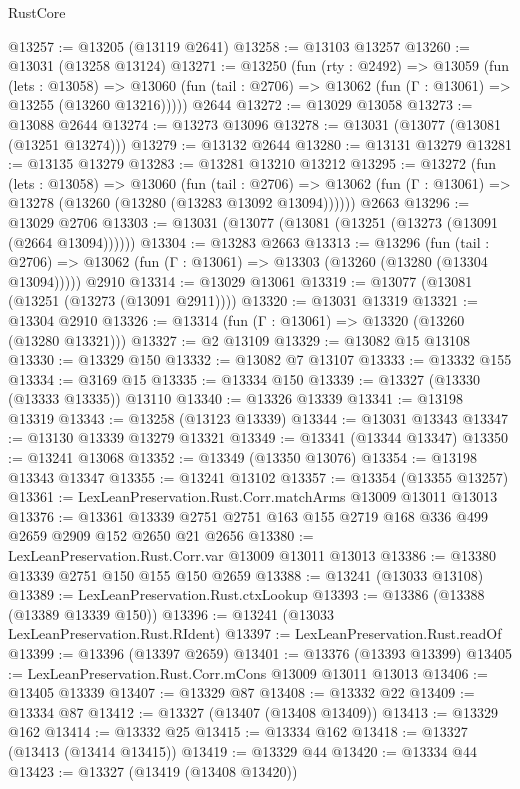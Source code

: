 \begin{lexlean}{RustCore}
\begin{coremodule}
@13257 := @13205 (@13119 @2641)
@13258 := @13103 @13257
@13260 := @13031 (@13258 @13124)
@13271 := @13250
    (fun (rty : @2492) =>
    @13059
      (fun (lets : @13058) =>
      @13060 (fun (tail : @2706) => @13062 (fun (Γ : @13061) => @13255 (@13260 @13216)))))
    @2644
@13272 := @13029 @13058
@13273 := @13088 @2644
@13274 := @13273 @13096
@13278 := @13031 (@13077 (@13081 (@13251 @13274)))
@13279 := @13132 @2644
@13280 := @13131 @13279
@13281 := @13135 @13279
@13283 := @13281 @13210 @13212
@13295 := @13272
    (fun (lets : @13058) =>
    @13060
      (fun (tail : @2706) =>
      @13062 (fun (Γ : @13061) => @13278 (@13260 (@13280 (@13283 @13092 @13094))))))
    @2663
@13296 := @13029 @2706
@13303 := @13031 (@13077 (@13081 (@13251 (@13273 (@13091 (@2664 @13094))))))
@13304 := @13283 @2663
@13313 := @13296
    (fun (tail : @2706) => @13062 (fun (Γ : @13061) => @13303 (@13260 (@13280 (@13304 @13094)))))
    @2910
@13314 := @13029 @13061
@13319 := @13077 (@13081 (@13251 (@13273 (@13091 @2911))))
@13320 := @13031 @13319
@13321 := @13304 @2910
@13326 := @13314 (fun (Γ : @13061) => @13320 (@13260 (@13280 @13321)))
@13327 := @2 @13109
@13329 := @13082 @15 @13108
@13330 := @13329 @150
@13332 := @13082 @7 @13107
@13333 := @13332 @155
@13334 := @3169 @15
@13335 := @13334 @150
@13339 := @13327 (@13330 (@13333 @13335)) @13110
@13340 := @13326 @13339
@13341 := @13198 @13319
@13343 := @13258 (@13123 @13339)
@13344 := @13031 @13343
@13347 := @13130 @13339 @13279 @13321
@13349 := @13341 (@13344 @13347)
@13350 := @13241 @13068
@13352 := @13349 (@13350 @13076)
@13354 := @13198 @13343 @13347
@13355 := @13241 @13102
@13357 := @13354 (@13355 @13257)
@13361 := LexLeanPreservation.Rust.Corr.matchArms @13009 @13011 @13013
@13376 := @13361 @13339 @2751 @2751 @163 @155 @2719 @168 @336 @499 @2659 @2909 @152 @2650 @21 @2656
@13380 := LexLeanPreservation.Rust.Corr.var @13009 @13011 @13013
@13386 := @13380 @13339 @2751 @150 @155 @150 @2659
@13388 := @13241 (@13033 @13108)
@13389 := LexLeanPreservation.Rust.ctxLookup
@13393 := @13386 (@13388 (@13389 @13339 @150))
@13396 := @13241 (@13033 LexLeanPreservation.Rust.RIdent)
@13397 := LexLeanPreservation.Rust.readOf
@13399 := @13396 (@13397 @2659)
@13401 := @13376 (@13393 @13399)
@13405 := LexLeanPreservation.Rust.Corr.mCons @13009 @13011 @13013
@13406 := @13405 @13339
@13407 := @13329 @87
@13408 := @13332 @22
@13409 := @13334 @87
@13412 := @13327 (@13407 (@13408 @13409))
@13413 := @13329 @162
@13414 := @13332 @25
@13415 := @13334 @162
@13418 := @13327 (@13413 (@13414 @13415))
@13419 := @13329 @44
@13420 := @13334 @44
@13423 := @13327 (@13419 (@13408 @13420))

\end{coremodule}
\end{lexlean}
